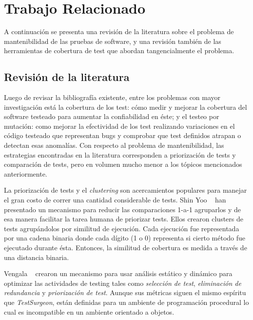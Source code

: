 \newpage
\section{Trabajo Relacionado}

\par A continuación se presenta una revisión de la literatura sobre el problema de mantenibilidad de las pruebas de software, y una revisión también de las herramientas de cobertura de test que abordan tangencialmente el problema.

\subsection{Revisión de la literatura}
\par Luego de revisar la bibliografía existente, entre los problemas con mayor investigación está la cobertura de los test: cómo medir y mejorar la cobertura del software testeado para aumentar la confiabilidad en éste; y  el testeo por mutación: como mejorar la efectividad de los test realizando variaciones en el código testeado que representan bugs y comprobar que test definidos atrapan o detectan esas anomalías. Con respecto al problema de mantenibilidad, las estrategias encontradas en la literatura corresponden a priorización de tests y comparación de tests, pero en volumen mucho menor a los tópicos mencionados anteriormente.

\par La priorización de tests y el \emph{clustering} son acercamientos populares para manejar el gran costo de correr una cantidad considerable de tests. Shin Yoo \etal~\cite{yoo2009clustering} han presentado un mecanismo para reducir las comparaciones 1-a-1 agruparlos y de esa manera facilitar la tarea humana de priorizar tests. Ellos crearon clusters de tests agrupándolos por similitud de ejecución. Cada ejecución fue representada por una cadena binaria donde cada dígito (1 o 0) representa si cierto método fue ejecutado durante ésta. Entonces, la similitud de cobertura es medida a través de una distancia binaria.

\par Vengala \etal~\cite{Vang09a} crearon un mecanismo para usar análisis estático y dinámico para optimizar las actividades de testing tales como \emph{selección de test}, \emph{eliminación de redundancia} y \emph{priorización de test}. Aunque sus métricas siguen el mismo espíritu que \emph{TestSurgeon}, están definidas para un ambiente de programación procedural lo cual es incompatible en un ambiente orientado a objetos.

